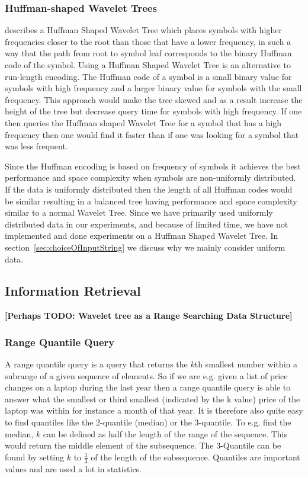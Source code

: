 \subsubsection{Huffman-shaped Wavelet Trees}
\citep[Section~4]{FMcountOnBWT} describes a Huffman Shaped Wavelet Tree which places symbols with higher frequencies closer to the root than those that have a lower frequency, in such a way that the path from root to symbol leaf corresponds to the binary Huffman code of the symbol. Using a Huffman Shaped Wavelet Tree is an alternative to run-length encoding.
The Huffman code of a symbol is a small binary value for symbols with high frequency and a larger binary value for symbols with the small frequency.
This approach would make the tree skewed and as a result increase the height of the tree but decrease query time for symbols with high frequency.
If one then queries the Huffman shaped Wavelet Tree for a symbol that has a high frequency then one would find it faster than if one was looking for a symbol that was less frequent.

Since the Huffman encoding is based on frequency of symbols it achieves the best performance and space complexity when symbols are non-uniformly distributed.
If the data is uniformly distributed then the length of all Huffman codes would be similar resulting in a balanced tree having performance and space complexity similar to a normal Wavelet Tree.
Since we have primarily used uniformly distributed data in our experiments, and because of limited time, we have not implemented and done experiments on a Huffman Shaped Wavelet Tree.
In section~\ref{sec:choiceOfInputString} we discuss why we mainly consider uniform data.


\subsection{Information Retrieval}
\textbf{[Perhaps TODO: Wavelet tree as a Range Searching Data Structure]}


\subsubsection{Range Quantile Query}
A range quantile query is a query that returns the $k$th smallest number within a subrange of a given sequence of elements.
So if we are e.g. given a list of price changes on a laptop during the last year then a range quantile query is able to answer what the smallest or third smallest (indicated by the k value) price of the laptop was within for instance a month of that year.
It is therefore also quite easy to find quantiles like the 2-quantile (median) or the 3-quantile. 
To e.g. find the median, $k$ can be defined as half the length of the range of the sequence.
This would return the middle element of the subsequence.
The 3-Quantile can be found by setting $k$ to $\frac{1}{3}$ of the length of the subsequence. 
Quantiles are important values and are used a lot in statistics.

